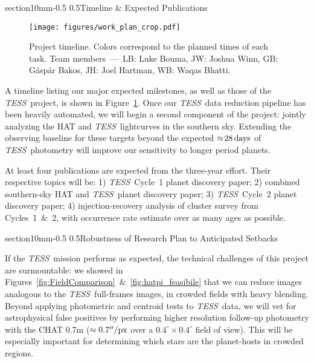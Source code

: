 \documentclass[letterpaper,11pt]{article}
\makeatletter
\renewcommand\section{\@startsection%
{section}{1}{0mm}{-0.5\baselineskip}%
{0.5\baselineskip}{\normalfont\normalsize\bfseries}}%
\newcommand{\tess}{{\it TESS}}
\makeatother
\begin{document}
\vspace{-0.3mm}
\section{Timeline \& Expected Publications}
\vspace{-0.3mm}
\begin{figure}[!h]
    \centering
    \texttt{[image: figures/work\_plan\_crop.pdf]}
    \caption{
    Project timeline. Colors correspond to the planned times of each task.
    Team members~---~LB: Luke Bouma, JW: Joshua Winn, GB: G\'asp\'ar 
    Bakos, JH: Joel Hartman, WB: Waqas Bhatti.
    \label{fig:work_plan}}
\end{figure}

A timeline listing our major expected milestones, as well as those of the 
\tess\ project, is shown in Figure~\ref{fig:work_plan}.
Once our \tess\ data reduction pipeline has been heavily automated, we will 
begin a second component of the project: jointly analyzing the HAT and \tess\ 
lightcurves in the southern sky.
Extending the observing baseline for these targets beyond the expected 
$\approx\!28\,{\rm days}$ of \tess\ photometry will improve our sensitivity 
to longer period planets.

At least four publications are expected from the three-year effort.
Their respective topics will be:
1) \tess\ Cycle~1 planet discovery paper;
2) combined southern-sky HAT and \tess\ planet discovery paper;
3) \tess\ Cycle~2 planet discovery paper;
4) injection-recovery analysis of cluster survey from Cycles~1~\&~2, with 
occurrence rate estimate over as many ages as possible.



\vspace{-0.3mm}
\section{Robustness of Research Plan to Anticipated Setbacks}
\vspace{-0.3mm}

If the \tess\ mission performs as expected, the technical challenges of this 
project are surmountable: we showed in 
Figures~\ref{fig:FieldComparison}~\&~\ref{fig:hatpi_feasibile} that we
can reduce images analogous to the \tess\ full-frames images, in crowded 
fields with heavy blending.
Beyond applying photometric and centroid tests to \tess\ data, we will 
vet for astrophysical false positives by performing higher resolution 
follow-up photometry with the CHAT 0.7m ($\approx 0.7''/{\rm px}$ over a 
$0.4^\circ\times 0.4^\circ$ 
field of view). This will be especially important for determining which stars 
are the planet-hosts in crowded regions.
\end{document}
